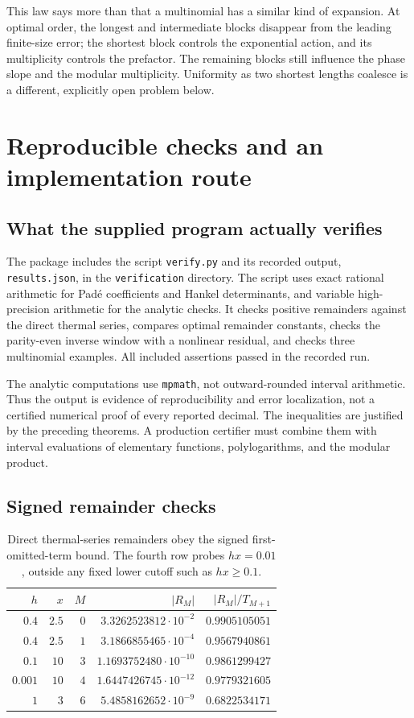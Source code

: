 \documentclass[11pt,a4paper]{article}
\numberwithin{equation}{section}
\theoremstyle{plain}
\theoremstyle{definition}
\theoremstyle{remark}
\begin{document}
This law says more than that a multinomial has a similar kind of expansion.
At optimal order, the longest and intermediate blocks disappear from the
leading finite-size error; the shortest block controls the exponential action,
and its multiplicity controls the prefactor. The remaining blocks still
influence the phase slope and the modular multiplicity. Uniformity as two
shortest lengths coalesce is a different, explicitly open problem below.

\section{Reproducible checks and an implementation route}
\label{sec:computation}

\subsection{What the supplied program actually verifies}
The package includes the script \texttt{verify.py} and its recorded output,
\texttt{results.json}, in the \texttt{verification} directory. The script uses exact rational
arithmetic for Pad\'e coefficients and Hankel determinants, and variable
high-precision arithmetic for the analytic checks. It checks positive
remainders against the direct thermal series, compares optimal remainder
constants, checks the parity-even inverse window with a nonlinear residual,
and checks three multinomial examples. All included assertions passed in the
recorded run.

The analytic computations use \texttt{mpmath}, not outward-rounded interval
arithmetic. Thus the output is evidence of reproducibility and error
localization, not a certified numerical proof of every reported decimal.
The inequalities are justified by the preceding theorems. A production
certifier must combine them with interval evaluations of elementary functions,
polylogarithms, and the modular product.

\subsection{Signed remainder checks}
\begin{table}[htbp]
\centering
\begin{tabular}{@{}rrrrr@{}}
\toprule
$h$ & $x$ & $M$ & $|R_M|$ & $|R_M|/T_{M+1}$\\
\midrule
$0.4$ & $2.5$ & $0$ & $3.3262523812\cdot10^{-2}$ & $0.9905105051$\\
$0.4$ & $2.5$ & $1$ & $3.1866855465\cdot10^{-4}$ & $0.9567940861$\\
$0.1$ & $10$ & $3$ & $1.1693752480\cdot10^{-10}$ & $0.9861299427$\\
$0.001$ & $10$ & $4$ & $1.6447426745\cdot10^{-12}$ & $0.9779321605$\\
$1$ & $3$ & $6$ & $5.4858162652\cdot10^{-9}$ & $0.6822534171$\\
\bottomrule
\end{tabular}
\caption{Direct thermal-series remainders obey the signed first-omitted-term
bound. The fourth row probes $hx=0.01$, outside any fixed lower cutoff such
as $hx\ge0.1$.}
\label{tab:signed}
\end{table}
\end{document}
